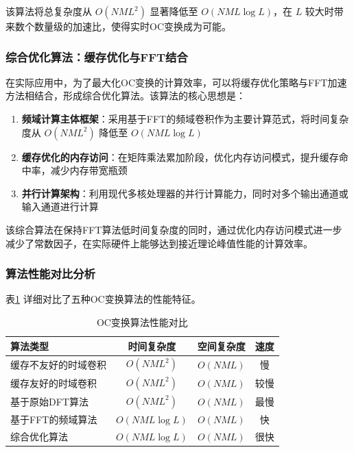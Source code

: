 该算法将总复杂度从 $O(NML^2)$ 显著降低至 $O(NML \log L)$，在 $L$ 较大时带来数个数量级的加速比，使得实时OC变换成为可能。

\subsubsection{综合优化算法：缓存优化与FFT结合}

在实际应用中，为了最大化OC变换的计算效率，可以将缓存优化策略与FFT加速方法相结合，形成综合优化算法。该算法的核心思想是：

\begin{enumerate}
    \item \textbf{频域计算主体框架}：采用基于FFT的频域卷积作为主要计算范式，将时间复杂度从 $O(NML^2)$ 降低至 $O(NML \log L)$
    \item \textbf{缓存优化的内存访问}：在矩阵乘法累加阶段，优化内存访问模式，提升缓存命中率，减少内存带宽瓶颈
    \item \textbf{并行计算架构}：利用现代多核处理器的并行计算能力，同时对多个输出通道或输入通道进行计算
\end{enumerate}

该综合算法在保持FFT算法低时间复杂度的同时，通过优化内存访问模式进一步减少了常数因子，在实际硬件上能够达到接近理论峰值性能的计算效率。

\subsubsection{算法性能对比分析}

表\ref{tab:algorithm-comparison} 详细对比了五种OC变换算法的性能特征。

\begin{table}[htbp]
    \centering
    \caption{OC变换算法性能对比}
    \label{tab:algorithm-comparison}
    \begin{tabular}{lccc}
        \toprule
        \textbf{算法类型} & \textbf{时间复杂度}  & \textbf{空间复杂度} & \textbf{速度} \\
        \midrule
        缓存不友好的时域卷积    & $O(NML^2)$      & $O(NML)$       & 慢           \\
        缓存友好的时域卷积     & $O(NML^2)$      & $O(NML)$       & 较慢          \\
        基于原始DFT算法     & $O(NML^2)$      & $O(NML)$       & 最慢          \\
        基于FFT的频域算法    & $O(NML \log L)$ & $O(NML)$       & 快           \\
        综合优化算法        & $O(NML \log L)$ & $O(NML)$       & 很快          \\
        \bottomrule
    \end{tabular}
\end{table}

